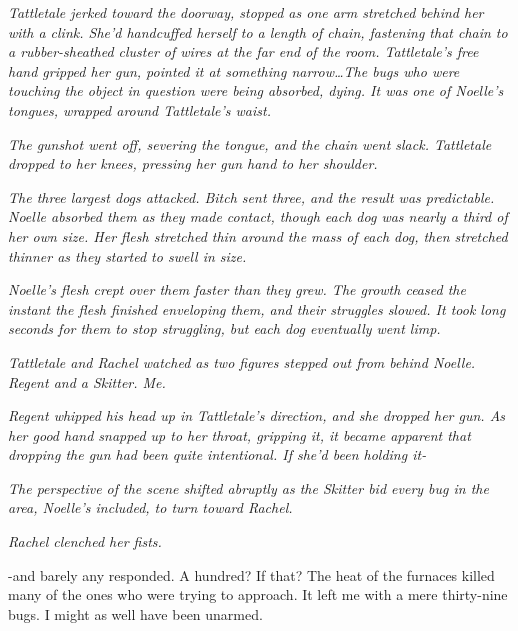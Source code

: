 \blacksquare



\emph{Tattletale jerked toward the doorway, stopped as one arm stretched behind her with a clink.  She'd handcuffed herself to a length of chain, fastening that chain to a rubber-sheathed cluster of wires at the far end of the room.  Tattletale's free hand gripped her gun, pointed it at something narrow\ldots The bugs who were touching the object in question were being absorbed, dying.  It was one of Noelle's tongues, wrapped around Tattletale's waist.}



\emph{The gunshot went off, severing the tongue, and the chain went slack.  Tattletale dropped to her knees, pressing her gun hand to her shoulder.}



\emph{The three largest dogs attacked.  Bitch sent three, and the result was predictable.  Noelle absorbed them as they made contact, though each dog was nearly a third of her own size.  Her flesh stretched thin around the mass of each dog, then stretched thinner as they started to swell in size.}



\emph{Noelle's flesh crept over them faster than they grew.  The growth ceased the instant the flesh finished enveloping them, and their struggles slowed.  It took long seconds for them to stop struggling, but each dog eventually went limp.}



\emph{Tattletale and Rachel watched as two figures stepped out from behind Noelle.  Regent and a Skitter.  Me.}



\emph{Regent whipped his head up in Tattletale's direction, and she dropped her gun.  As her good hand snapped up to her throat, gripping it, it became apparent that dropping the gun had been quite intentional.  If she'd been holding it-}



\emph{The perspective of the scene shifted abruptly as the Skitter bid every bug in the area, Noelle's included, to turn toward Rachel.}



\emph{Rachel clenched her fists.}



\blacksquare



-and barely any responded.  A hundred?  If that?  The heat of the furnaces killed many of the ones who were trying to approach.  It left me with a mere thirty-nine bugs.  I might as well have been unarmed.



